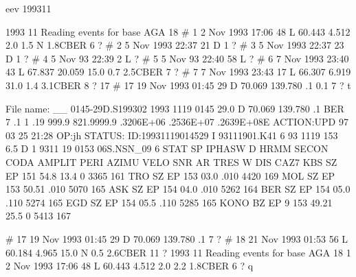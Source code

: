 \begin{boxedverbatim}
eev 199311

1993 11 Reading events for base AGA          18
#    1  2 Nov 1993 17:06 48 L   60.443    4.512  2.0  1.5 N 1.8CBER    6  ? 
#    2  5 Nov 1993 22:37 21 D                                          1  ? 
#    3  5 Nov 1993 22:37 23 D                                          1  ? 
#    4  5 Nov   93 22:39  2 L                                             ? 
#    5  5 Nov   93 22:40 58 L                                             ? 
#    6  7 Nov 1993 23:40 43 L   67.837   20.059 15.0  0.7  2.5CBER     7  ? 
#    7  7 Nov 1993 23:43 17 L   66.307    6.919 31.0  1.4  3.1CBER     8  ? 17
#   17 19 Nov 1993 01:45 29 D   70.069  139.780   .1  0.1              7  ? t
 
File name: \seismo\REA\AGA__ 0145-29D.S199302                                         
1993 1119 0145 29.0 D  70.069 139.780   .1  BER  7  .1                        1
                .19     999.9   821.9999.9   .3206E+06   .2536E+07   .2639E+08E
ACTION:UPD 97 03 25 21:28 OP:jh   STATUS:               ID:19931119014529     I
93111901.K41                                                                  6
  93 1119  153  6.5 D                                                         1
9311 19 0153 06S.NSN_09                                                       6
STAT SP IPHASW D HRMM SECON CODA AMPLIT PERI AZIMU VELO SNR AR TRES W  DIS CAZ7
KBS  SZ EP        151 54.8                                     13.4 0 3365 161 
TRO  SZ EP        153 03.0                                       .010 4420 169 
MOL  SZ EP        153 50.51                                      .010 5070 165 
ASK  SZ EP        154 04.0                                       .010 5262 164 
BER  SZ EP        154 05.0                                       .110 5274 165 
EGD  SZ EP        154 05.5                                       .110 5285 165 
KONO BZ EP   9    153 49.21                                    25.5 0 5413 167 
                                                                               

#   17 19 Nov 1993 01:45 29 D   70.069  139.780   .1                     7  ? 
#   18 21 Nov 1993 01:53 56 L   60.184    4.965 15.0  N 0.5  2.6CBER    11  ? 
 1993 11 Reading events for base AGA          18
    1  2 Nov 1993 17:06 48 L   60.443    4.512  2.0     2.2  1.8CBER     6  ? q
\end{boxedverbatim}
